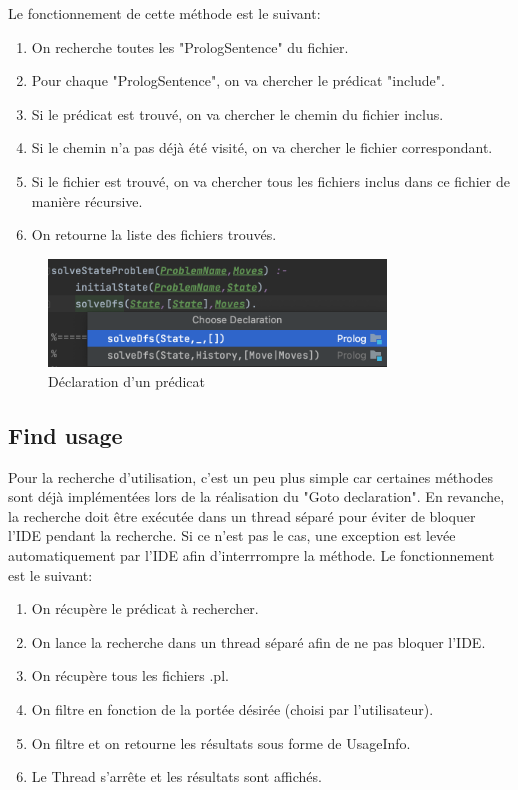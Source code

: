 \noindent Le fonctionnement de cette méthode est le suivant:
\begin{enumerate}
    \item On recherche toutes les "PrologSentence" du fichier.
    \item Pour chaque "PrologSentence", on va chercher le prédicat "include".
    \item Si le prédicat est trouvé, on va chercher le chemin du fichier inclus.
    \item Si le chemin n'a pas déjà été visité, on va chercher le fichier correspondant.
    \item Si le fichier est trouvé, on va chercher tous les fichiers inclus dans ce fichier de manière récursive.
    \item On retourne la liste des fichiers trouvés.
\end{enumerate}


\begin{figure}[H]
    \centering
    \includegraphics[width=0.8\textwidth]{images/Goto_Declaration.png}
    \caption{Déclaration d'un prédicat}
    \label{fig:definition}
\end{figure}

\subsection{Find usage}
\noindent Pour la recherche d'utilisation, c'est un peu plus simple car certaines méthodes sont déjà implémentées lors de la réalisation du "Goto declaration".
\newdoubleline
En revanche, la recherche doit être exécutée dans un thread séparé pour éviter de bloquer l'IDE pendant la recherche. Si ce n'est pas le cas, une exception est levée automatiquement par l'IDE afin d'interrrompre la méthode.
\newdoubleline
Le fonctionnement est le suivant:
\begin{enumerate}
    \item On récupère le prédicat à rechercher.
    \item On lance la recherche dans un thread séparé afin de ne pas bloquer l'IDE.
    \item On récupère tous les fichiers .pl.
    \item On filtre en fonction de la portée désirée (choisi par l'utilisateur).
    \item On filtre et on retourne les résultats sous forme de UsageInfo.
    \item Le Thread s'arrête et les résultats sont affichés.
\end{enumerate}

